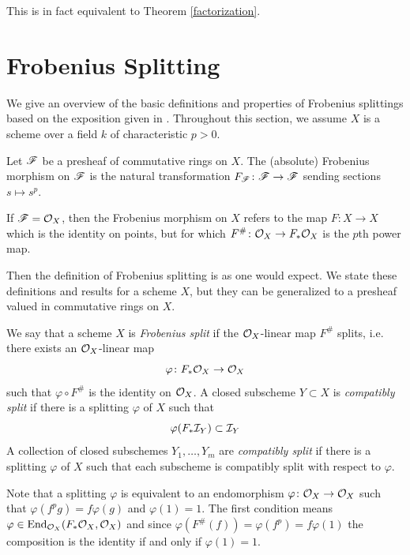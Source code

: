 \documentclass[12pt]{article}
\begin{document}
This is in fact equivalent to Theorem \ref{factorization}.


\section{Frobenius Splitting}\label{frobsplit}

We give an overview of the basic definitions and properties of Frobenius splittings based on the exposition given in \cite{Brion2004}. Throughout this section, we assume $X$ is a scheme over a field $k$ of characteristic $p > 0$.

\begin{defn}
    Let $\mathscr{F}$ be a presheaf of commutative rings on $X$. The (absolute) Frobenius morphism on $\mathscr{F}$ is the natural transformation $F_{\mathscr{F}} \colon \mathscr{F} \rightarrow \mathscr{F}$ sending sections $s \mapsto s^p$.

    If $\mathscr{F} = \mathcal{O}_X$, then the Frobenius morphism on $X$ refers to the map $F \colon X \to X$ which is the identity on points, but for which $F^\# \colon \mathcal{O}_X \to F_* \mathcal{O}_X$ is the $p$th power map.
\end{defn}

Then the definition of Frobenius splitting is as one would expect. We state these definitions and results for a scheme $X$, but they can be generalized to a presheaf valued in commutative rings on $X$.

\begin{defn} We say that a scheme $X$ is \textit{Frobenius split} if the $\mathcal{O}_X$-linear map $F^{\#}$ splits, i.e. there exists an $\mathcal{O}_X$-linear map
    \[\varphi \colon F_* \mathcal{O}_X \rightarrow \mathcal{O}_X\]
    such that $\varphi \circ F^{\#} $ is the identity on $\mathcal{O}_X$. A closed subscheme $Y \subset X$ is \textit{compatibly split} if there is a splitting $\varphi$ of $X$ such that 
    \[\varphi(F_* \mathcal{I}_Y) \subset \mathcal{I}_Y\]
    A collection of closed subschemes $Y_1,\ldots,Y_m$ are \textit{compatibly split} if there is a splitting $\varphi$ of $X$ such that each subscheme is compatibly split with respect to $\varphi$.
\end{defn}
Note that a splitting $\varphi$ is equivalent to an endomorphism $\varphi \colon \mathcal{O}_X \to \mathcal{O}_X$ such that $\varphi(f^p g) = f \varphi(g)$ and $\varphi(1) = 1$. The first condition means $\varphi \in \operatorname{End}_{\mathcal{O}_X}(F_* \mathcal{O}_X, \mathcal{O}_X)$ and since $\varphi(F^{\#}(f)) = \varphi(f^p) = f\varphi(1)$ the composition is the identity if and only if $\varphi(1) = 1$.
\end{document}
